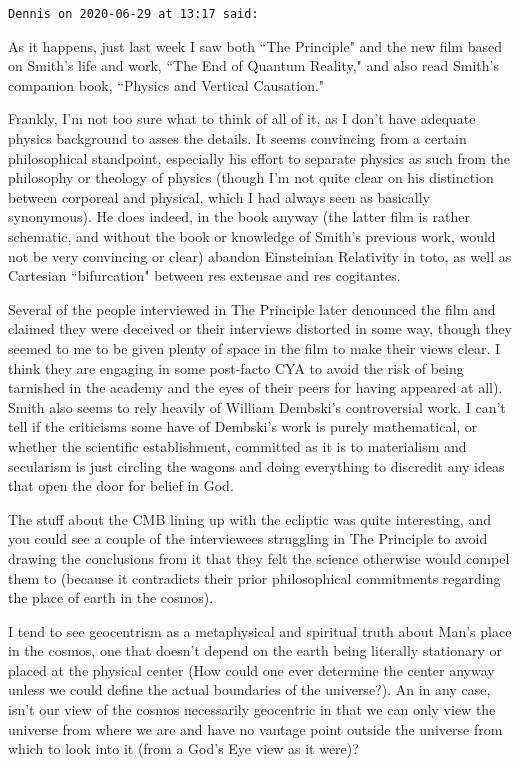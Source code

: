 \begin{footnotesize}\begin{sffamily}



\texttt{Dennis on 2020-06-29 at 13:17 said: }

As it happens, just last week I saw both ``The Principle" and the new film based on Smith's life and work, ``The End of Quantum Reality," and also read Smith's companion book, ``Physics and Vertical Causation."

Frankly, I'm not too sure what to think of all of it, as I don't have adequate physics background to asses the details. It seems convincing from a certain philosophical standpoint, especially his effort to separate physics as such from the philosophy or theology of physics (though I'm not quite clear on his distinction between corporeal and physical, which I had always seen as basically synonymous). He does indeed, in the book anyway (the latter film is rather schematic, and without the book or knowledge of Smith's previous work, would not be very convincing or clear) abandon Einsteinian Relativity in toto, as well as Cartesian ``bifurcation" between res extensae and res cogitantes. 

Several of the people interviewed in The Principle later denounced the film and claimed they were deceived or their interviews distorted in some way, though they seemed to me to be given plenty of space in the film to make their views clear. I think they are engaging in some post-facto CYA to avoid the risk of being tarnished in the academy and the eyes of their peers for having appeared at all). Smith also seems to rely heavily of William Dembski's controversial work. I can't tell if the criticisms some have of Dembski's work is purely mathematical, or whether the scientific establishment, committed as it is to materialism and secularism is just circling the wagons and doing everything to discredit any ideas that open the door for belief in God. 

The stuff about the CMB lining up with the ecliptic was quite interesting, and you could see a couple of the interviewees struggling in The Principle to avoid drawing the conclusions from it that they felt the science otherwise would compel them to (because it contradicts their prior philosophical commitments regarding the place of earth in the cosmos).

I tend to see geocentrism as a metaphysical and spiritual truth about Man's place in the cosmos, one that doesn't depend on the earth being literally stationary or placed at the physical center (How could one ever determine the center anyway unless we could define the actual boundaries of the universe?). An in any case, isn't our view of the cosmos necessarily geocentric in that we can only view the universe from where we are and have no vantage point outside the universe from which to look into it (from a God's Eye view as it were)?



\end{sffamily}
\end{footnotesize}
